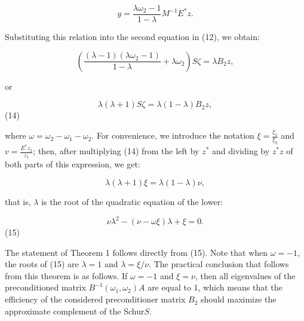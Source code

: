 \documentclass{article}
\begin{document}
\[
y = \frac{\lambda \omega_2 - 1}{1 - \lambda} M^{-1}E^*z.
\]

Substituting this relation into the second equation in (12), we obtain:

\[
\left( \frac{(\lambda - 1)(\lambda \omega_2 - 1)}{1 - \lambda} + \lambda \omega_2 \right) S\zeta = \lambda B_2z,
\]

or

\[
\lambda (\lambda + 1) S\zeta = \lambda (1 - \lambda) B_2z,
\]
(14)

where \( \omega = \omega_2 - \omega_1 - \omega_2 \). For convenience, we introduce the notation \( \xi = \frac{\xi_1}{\xi_2} \) and \(v=\frac{E^*z_2}{z_1} \); then, after multiplying (14) from the left by \(z^*\) and dividing by \(z^*z\) of both parts of this expression, we get:

\[
\lambda (\lambda + 1) \xi = \lambda (1 - \lambda) \nu,
\]

that is, \(\lambda\) is the root of the quadratic equation of the lower:

\[
\nu \lambda^2 - (\nu - \omega \xi) \lambda + \xi = 0.
\]
(15)

The statement of Theorem 1 follows directly from (15). Note that when \(\omega = -1\), the roots of (15) are \(\lambda = 1\) and \(\lambda =\xi/\nu\). The practical conclusion that follows from this theorem is as follows. If \(\omega = -1\) and \(\xi = \nu\), then all eigenvalues of the preconditioned matrix \(B^{-1}(\omega_1, \omega_2)A\) are equal to 1, which means that the efficiency of the considered preconditioner matrix \(B_2\) should maximize the approximate complement of the Schur\(S\).
\end{document}
